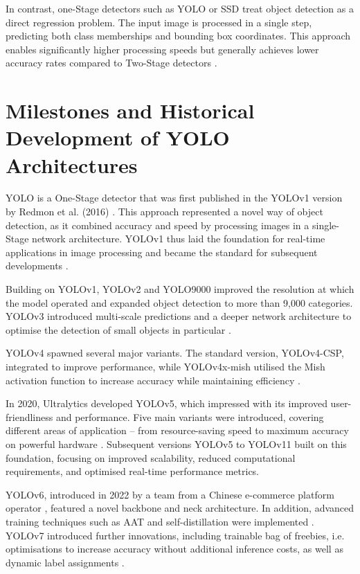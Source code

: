 In contrast, one-Stage detectors such as \Acrfull{YOLO} \cite{redmon2016} or \Acrfull{SSD} \cite{Liu_2016} treat object detection as a direct regression problem. The input image is processed in a single step, predicting both class memberships and bounding box coordinates. This approach enables significantly higher processing speeds but generally achieves lower accuracy rates compared to Two-Stage detectors \cite{Soviany2018}.



\section{Milestones and Historical Development of YOLO Architectures}

\acrfull{YOLO} is a One-Stage detector that was first published in the YOLOv1 version by Redmon et al. (2016) \cite{redmon2016}. This approach represented a novel way of object detection, as it combined accuracy and speed by processing images in a single-Stage network architecture. YOLOv1 thus laid the foundation for real-time applications in image processing and became the standard for subsequent developments \cite{Sapkota2025}.

Building on YOLOv1, YOLOv2 and YOLO9000 \cite{Li2018,Nakahara2018} improved the resolution at which the model operated and expanded object detection to more than 9,000 categories. YOLOv3 introduced multi-scale predictions and a deeper network architecture to optimise the detection of small objects in particular \cite{Kim2018}.

YOLOv4 spawned several major variants. The standard version, YOLOv4-CSP, integrated  to improve performance, while YOLOv4x-mish utilised the Mish activation function to increase accuracy while maintaining efficiency \cite{Nepal2022,Sozzi2022,Mohod2023}.

In 2020, Ultralytics developed YOLOv5, which impressed with its improved user-friendliness and performance. Five main variants were introduced, covering different areas of application – from resource-saving speed to maximum accuracy on powerful hardware \cite{Sapkota2025,ultralyics_2020}. Subsequent versions YOLOv5 to YOLOv11 built on this foundation, focusing on improved scalability, reduced computational requirements, and optimised real-time performance metrics.

YOLOv6, introduced in 2022 by a team from a Chinese e-commerce platform operator \cite{li2022}, featured a novel backbone and neck architecture. In addition, advanced training techniques such as \acrfull{AAT} and self-distillation were implemented \cite{Sapkota2025,li2022}. YOLOv7 \cite{wang2022,Wang2023} introduced further innovations, including trainable bag of freebies, i.e. optimisations to increase accuracy without additional inference costs, as well as dynamic label assignments \cite{wang2022,Wang2023,Sapkota2025}.

